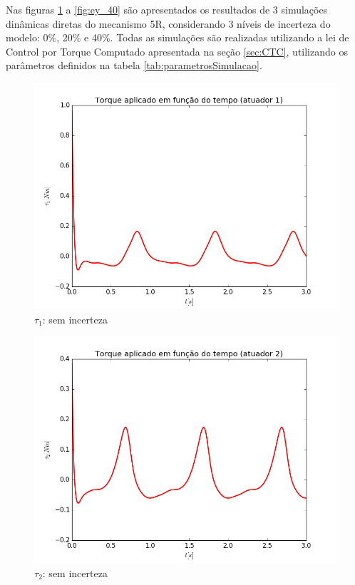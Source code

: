 \documentclass[]{politex}
\begin{document}
Nas figuras \ref{fig:Torque1_0} a \ref{fig:ey_40} são apresentados os resultados de 3 simulações dinâmicas diretas do mecanismo 5R, considerando 3 níveis de incerteza do modelo: 0\%, 20\% e 40\%. Todas as simulações são realizadas utilizando a lei de Control por Torque Computado apresentada na seção \ref{sec:CTC}, utilizando os parâmetros definidos na tabela \ref{tab:parametrosSimulacao}.

\begin{multicols}{2}
\begin{figure}[H]
	\centering
	\includegraphics[scale=0.42]{imagens/tau1_0.png}  
	\caption{$\tau_1$: sem incerteza}
	\label{fig:Torque1_0}
\end{figure}
\begin{figure}[H]
	\centering
	\includegraphics[scale=0.42]{imagens/tau2_0.png}  
	\caption{$\tau_2$: sem incerteza}
	\label{fig:Torque2_0}
\end{figure}
\end{multicols}
\end{document}
